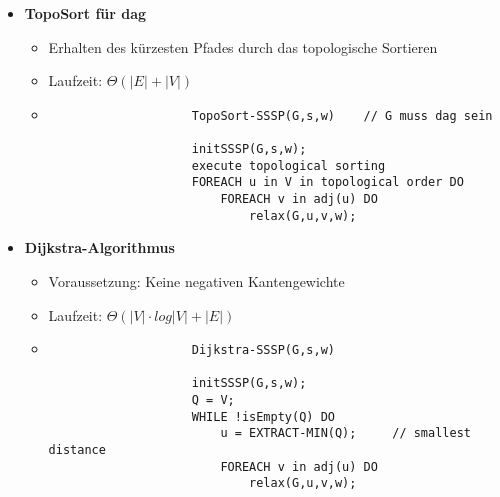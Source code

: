 \begin{itemize}
\begin{itemize}
\begin{verbatim}
                    initSSSP(G,s,w);
                    FOR i = 1 TO |V|-1 DO
                        FOREACH (u,v) in E DO
                            relax(G,u,v,w);
                    FOREACH (u,v) in E DO   // Prüfung ob negativer Zyklus
                        IF v.dist > u.dist+w((u,v)) THEN
                            return false;
                    return true;

                    initSSSP(G,s,w)

                    FOREACH v in V DO
                        v.dist = |$\infty$|;
                        v.pred = nil;
                    s.dist = 0;
                    \end{verbatim}
            \end{itemize}

\pagebreak

        \item \textbf{TopoSort für dag}
            \begin{itemize}
                \item Erhalten des kürzesten Pfades durch das topologische Sortieren
                \item Laufzeit: $\Theta(|E| + |V|)$
                \item[]
                    \begin{verbatim}
                    TopoSort-SSSP(G,s,w)    // G muss dag sein

                    initSSSP(G,s,w);
                    execute topological sorting
                    FOREACH u in V in topological order DO
                        FOREACH v in adj(u) DO
                            relax(G,u,v,w);
                    \end{verbatim}
            \end{itemize}

        \item \textbf{Dijkstra-Algorithmus}
            \begin{itemize}
                \item Voraussetzung: Keine negativen Kantengewichte
                \item Laufzeit: $\Theta(|V| \cdot log|V| + |E|)$
                \item[]
                    \begin{verbatim}
                    Dijkstra-SSSP(G,s,w)

                    initSSSP(G,s,w);
                    Q = V;
                    WHILE !isEmpty(Q) DO
                        u = EXTRACT-MIN(Q);     // smallest distance
                        FOREACH v in adj(u) DO
                            relax(G,u,v,w);
                    \end{verbatim}
            \end{itemize}
    \end{itemize}

